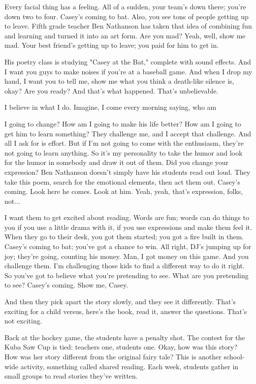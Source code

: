 Every facial thing has a feeling. All of a sudden, your team's down there; you're down two to four. Casey's coming to bat. Also, you see tons of people getting up to leave. Fifth grade teacher Ben Nathanson has taken that idea of combining fun and learning and turned it into an art form. Are you mad? Yeah, well, show me mad. Your best friend's getting up to leave; you paid for him to get in.

His poetry class is studying "Casey at the Bat," complete with sound effects. And I want you guys to make noises if you're at a baseball game. And when I drop my hand, I want you to tell me, show me what you think a death-like silence is, okay? Are you ready? And that's what happened. That's unbelievable.

I believe in what I do. Imagine, I come every morning saying, who am

 I going to change? How am I going to make his life better? How am I going to get him to learn something? They challenge me, and I accept that challenge. And all I ask for is effort. But if I'm not going to come with the enthusiasm, they're not going to learn anything. So it's my personality to take the humor and look for the humor in somebody and draw it out of them. Did you change your expression? Ben Nathanson doesn't simply have his students read out loud. They take this poem, search for the emotional elements, then act them out. Casey's coming. Look here he comes. Look at him. Yeah, yeah, that's expression, folks, not...

I want them to get excited about reading. Words are fun; words can do things to you if you use a little drama with it, if you use expressions and make them feel it. When they go to their desk, you got them started; you got a fire built in them. Casey's coming to bat; you've got a chance to win. All right, DJ's jumping up for joy; they're going, counting his money. Man, I got money on this game. And you challenge them. I'm challenging those kids to find a different way to do it right. So you've got to believe what you're pretending to see. What are you pretending to see? Casey's coming. Show me, Casey.

And then they pick apart the story slowly, and they see it differently. That's exciting for a child versus, here's the book, read it, answer the questions. That's not exciting.

Back at the hockey game, the students have a penalty shot. The contest for the Kuba Saw Cup is tied: teachers one, students one. Okay, how was this story? How was her story different from the original fairy tale? This is another school-wide activity, something called shared reading. Each week, students gather in small groups to read stories they've written.

